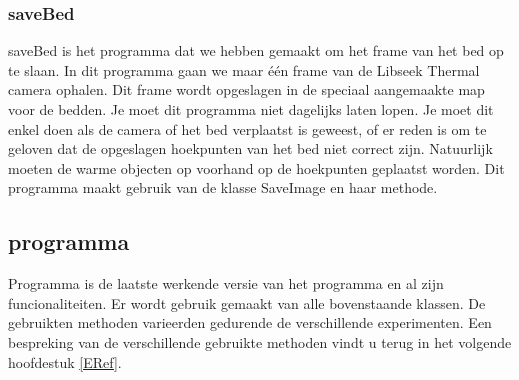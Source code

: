 \subsubsection{saveBed}
saveBed is het programma dat we hebben gemaakt om het frame van het bed op te slaan. In dit programma gaan we maar \'e\'en frame van de Libseek Thermal camera ophalen. Dit frame wordt opgeslagen in de speciaal aangemaakte map voor de bedden. Je moet dit programma niet dagelijks laten lopen. Je moet dit enkel doen als de camera of het bed verplaatst is geweest, of er reden is om te geloven dat de opgeslagen hoekpunten van het bed niet correct zijn. Natuurlijk moeten de warme objecten op voorhand op de hoekpunten geplaatst worden. Dit programma maakt gebruik van de klasse SaveImage en haar methode.

\subsection{programma} 
Programma is de laatste werkende versie van het programma en al zijn funcionaliteiten. Er wordt gebruik gemaakt van alle bovenstaande klassen. De gebruikten methoden varieerden gedurende de verschillende experimenten. Een bespreking van de verschillende gebruikte methoden vindt u terug in het volgende hoofdestuk \ref{ERef}.
